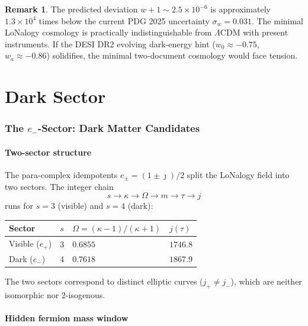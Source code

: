 \documentclass[12pt]{article}
\theoremstyle{plain}
\theoremstyle{definition}
\newtheorem{remark}[theorem]{Remark}
\numberwithin{equation}{section}
\begin{document}
\begin{remark}
The predicted deviation $w+1\sim2.5\times10^{-6}$ is approximately
$1.3\times10^4$ times below the current PDG 2025 uncertainty
$\sigma_w=0.031$.  The minimal LoNalogy cosmology is practically
indistinguishable from $\Lambda$CDM with present instruments.
If the DESI DR2 evolving dark-energy hint ($w_0\approx-0.75$,
$w_a\approx-0.86$) solidifies, the minimal two-document cosmology
would face tension.
\end{remark}

\part{Dark Sector}

\section{The $e_-$-Sector: Dark Matter Candidates}\label{sec:darksector}

\subsection{Two-sector structure}

The para-complex idempotents $e_\pm=(1\pm\jmath)/2$ split the LoNalogy
field into two sectors.  The integer chain
\[
s\to\kappa\to\Omega\to m\to\tau\to j
\]
runs for $s=3$ (visible) and $s=4$ (dark):

\begin{center}
\begin{tabular}{llll}
\toprule
Sector & $s$ & $\Omega=(\kappa-1)/(\kappa+1)$ & $j(\tau)$\\
\midrule
Visible ($e_+$) & 3 & $0.6855$ & $1746.8$\\
Dark ($e_-$) & 4 & $0.7618$ & $1867.9$\\
\bottomrule
\end{tabular}
\end{center}

The two sectors correspond to distinct elliptic curves ($j_+\neq j_-$),
which are neither isomorphic nor 2-isogenous.

\subsection{Hidden fermion mass window}
\end{document}
